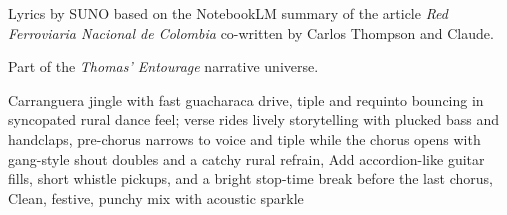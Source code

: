
\begin{notes}
Lyrics by SUNO based on the NotebookLM summary of the article \emph{Red Ferroviaria Nacional de Colombia} co-written by Carlos Thompson and Claude.

Part of the \emph{Thomas’ Entourage} narrative universe.
\end{notes}
\begin{style}
Carranguera jingle with fast guacharaca drive, tiple and requinto bouncing in syncopated rural dance feel; verse rides lively storytelling with plucked bass and handclaps, pre-chorus narrows to voice and tiple while the chorus opens with gang-style shout doubles and a catchy rural refrain, Add accordion-like guitar fills, short whistle pickups, and a bright stop-time break before the last chorus, Clean, festive, punchy mix with acoustic sparkle
\end{style}

